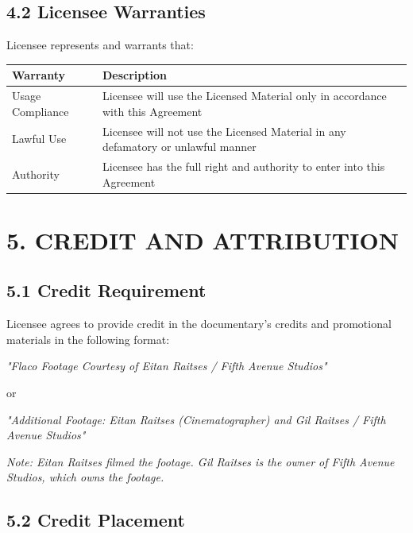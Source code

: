 \documentclass[
  11pt,
]{article}
\begin{document}
\hypertarget{licensee-warranties}{%
\subsection{4.2 Licensee Warranties}\label{licensee-warranties}}

Licensee represents and warrants that:

\begin{table}[h]
\centering
\begin{tabular}{L{3.5cm}L{10.5cm}}
\toprule
\textbf{Warranty} & \textbf{Description} \\
\midrule
Usage Compliance & Licensee will use the Licensed Material only in accordance with this Agreement \\
Lawful Use & Licensee will not use the Licensed Material in any defamatory or unlawful manner \\
Authority & Licensee has the full right and authority to enter into this Agreement \\
\bottomrule
\end{tabular}
\end{table}

\hypertarget{credit-and-attribution}{%
\section{5. CREDIT AND ATTRIBUTION}\label{credit-and-attribution}}

\hypertarget{credit-requirement}{%
\subsection{5.1 Credit Requirement}\label{credit-requirement}}

Licensee agrees to provide credit in the documentary's credits and
promotional materials in the following format:

\textit{"Flaco Footage Courtesy of Eitan Raitses / Fifth Avenue Studios"}

or

\textit{"Additional Footage: Eitan Raitses (Cinematographer) and Gil Raitses / Fifth Avenue Studios"}

\emph{Note: Eitan Raitses filmed the footage. Gil Raitses is the owner
of Fifth Avenue Studios, which owns the footage.}

\hypertarget{credit-placement}{%
\subsection{5.2 Credit Placement}\label{credit-placement}}
\end{document}
